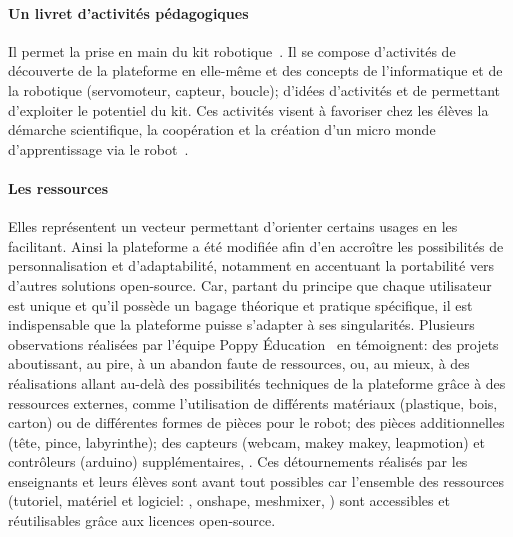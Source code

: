         \paragraph{Un livret d'activités pédagogiques} 
            Il permet la prise en main du kit robotique~.
            Il se compose d'activités de découverte de la plateforme en elle-même et des concepts de l'informatique et de la robotique (\eg servomoteur, capteur, boucle);
            d'idées d'activités et de  permettant d'exploiter le potentiel du kit.
            Ces activités visent à favoriser chez les élèves la démarche scientifique, la coopération et la création  d'un micro monde d'apprentissage via le robot~.
        \paragraph{Les ressources}
            Elles représentent un vecteur permettant d'orienter certains usages en les facilitant.
            Ainsi la plateforme a été modifiée afin d'en accroître les possibilités de personnalisation et d'adaptabilité, notamment en  accentuant la portabilité vers d'autres solutions open-source.
            Car, partant du principe que chaque utilisateur est unique et qu'il possède un bagage théorique et pratique spécifique, il est indispensable que la plateforme puisse s'adapter à ses singularités.
            Plusieurs observations réalisées par l'équipe Poppy Éducation~ en témoignent: des projets aboutissant, au pire, à un abandon faute de ressources, ou, au mieux, à des réalisations allant au-delà des possibilités techniques de la plateforme grâce à des ressources externes, comme l'utilisation de différents matériaux (plastique, bois, carton) ou de différentes formes de pièces pour le robot;
            des pièces additionnelles (tête, pince, labyrinthe);
            des capteurs (webcam, makey makey, leapmotion) et contrôleurs (arduino) supplémentaires, \etc.
            Ces détournements réalisés par les enseignants et leurs élèves sont avant tout possibles car l'ensemble des ressources (tutoriel, matériel et logiciel: , onshape, meshmixer, \etc) sont accessibles et réutilisables grâce aux licences open-source.
